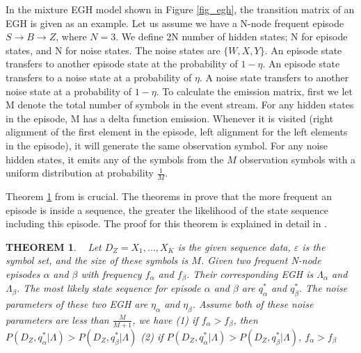 In the mixture EGH model shown in Figure \ref{fig_egh}, 
the transition matrix of an EGH is given as an example. 
Let us assume we have a N-node frequent episode $S\rightarrow B\rightarrow Z$, where $N=3$.
We define 2N number of hidden states; 
N for episode states, and N for noise states. 
The noise states are $\{W, X, Y\}$. 
An episode state transfers to another episode state 
at the probability of $1-\eta$.
An episode state transfers to a noise state 
at a probability of $\eta$. 
A noise state transfers to another noise state 
at a probability of $1-\eta$. 
To calculate the emission matrix, first we 
let M denote the total number of symbols in the event stream. 
For any hidden states in the episode, M has a delta function emission. 
Whenever it is visited (right alignment of the first element in the episode, 
left alignment for the left elements in the episode), 
it will generate the same observation symbol. 
For any noise hidden states, it emits any of the symbols from the $M$ 
observation symbols with a uniform distribution at probability $\frac{1}{M}$. 


Theorem \ref{theorem1} from \cite{laxman2008stream} is crucial.  
The theorems in \cite{laxman2008stream}
prove that the more frequent an episode is inside a sequence, 
the greater the likelihood of the state sequence including this episode. 
The proof for this theorem is explained in detail in \cite{laxman2008stream}. 


\newtheorem{mydef}{THEOREM}
\begin{mydef}
\label{theorem1}~\cite{laxman2008stream} 
Let $D_Z={X_1,..., X_K}$ is the given sequence data,  $\varepsilon$ is the symbol set, 
and the size of these symbols is $M$. 
Given two frequent N-node episodes $\alpha$ and $\beta$ with frequency $f_{\alpha}$ 
and $f_{\beta}$. Their corresponding EGH is $\Lambda_{\alpha}$ and $\Lambda_{\beta}$. 
The most likely state sequence for episode $\alpha$ and $\beta$ are
$q_{\alpha}^*$ and $q_{\beta}^*$. 
The noise parameters of these two EGH are 
$\eta_{\alpha}$ and $\eta_{\beta}$. 
Assume both of these noise parameters are less than $\frac{M}{M+1}$, 
we have 
(1) if $f_{\alpha} > f_{\beta}$, then $P(D_Z, q_{\alpha}^*| \Lambda) > P(D_Z, q_{\beta}^*| \Lambda)  $
(2) if $P(D_Z, q_{\alpha}^*| \Lambda) > P(D_Z, q_{\beta}^*| \Lambda)  $, $f_{\alpha} > f_{\beta}$
\end{mydef}

